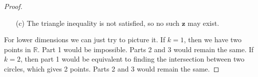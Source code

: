 \documentclass[12pt]{article}
\theoremstyle{remark}
\theoremstyle{named}
\renewcommand{\bf}{\mathbf}
\begin{document}
\begin{proof}
\begin{enumerate}
        \item[(c)] The triangle inequality is not satisfied, so no such $\bf z$ may exist. 
    \end{enumerate}

    For lower dimensions we can just try to picture it. If $k = 1$, then we have two points in $\mathbb R$. Part 1 would be impossible. Parts 2 and 3 would remain the same. If $k = 2$, then part 1 would be equivalent to finding the intersection between two circles, which gives 2 points. Parts 2 and 3 would remain the same.

\end{proof}
\end{document}

